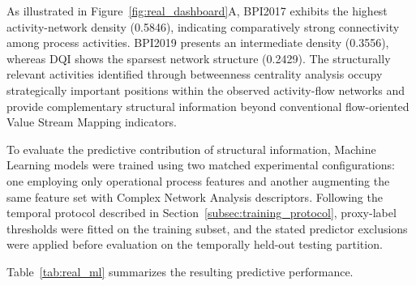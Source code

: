 \documentclass[pdflatex,iicol,Numbered,sn-basic]{sn-jnl}
\begin{document}
As illustrated in Figure~\ref{fig:real_dashboard}A, BPI2017 exhibits the
highest activity-network density (0.5846), indicating comparatively strong
connectivity among process activities. BPI2019 presents an intermediate
density (0.3556), whereas DQI shows the sparsest network structure
(0.2429). The structurally relevant activities identified through
betweenness centrality analysis occupy strategically important positions
within the observed activity-flow networks and provide complementary
structural information beyond conventional flow-oriented Value Stream
Mapping indicators.

To evaluate the predictive contribution of structural information,
Machine Learning models were trained using two matched experimental
configurations: one employing only operational process features and another
augmenting the same feature set with Complex Network Analysis descriptors.
Following the temporal protocol described in
Section~\ref{subsec:training_protocol}, proxy-label thresholds were fitted on the training subset, and the stated
predictor exclusions were applied before evaluation on the temporally
held-out testing partition.

Table~\ref{tab:real_ml} summarizes the resulting predictive performance.
\end{document}
